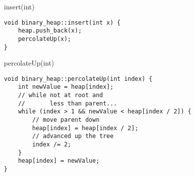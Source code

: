 \begin{frame}[fragile,label=heapInsert]{insert(int)}
\lstset{language=C++,style=small}
\begin{lstlisting}
void binary_heap::insert(int x) {
    heap.push_back(x);
    percolateUp(x);
}
\end{lstlisting}
\end{frame}

\begin{frame}[fragile,label=heapPercuolateUp]{percolateUp(int)}
\begin{lstlisting}
void binary_heap::percolateUp(int index) {
    int newValue = heap[index];
    // while not at root and
    //       less than parent...
    while (index > 1 && newValue < heap[index / 2]) {
        // move parent down
        heap[index] = heap[index / 2];
        // advanced up the tree
        index /= 2;
    }
    heap[index] = newValue;
}
\end{lstlisting}
\end{frame}

